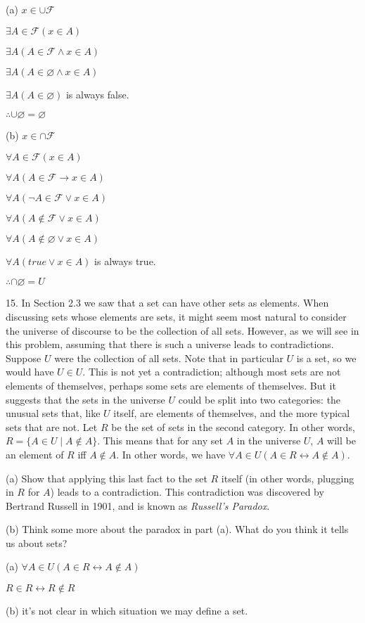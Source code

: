 \documentclass{article}
\begin{document}
(a) $x \in \cup \mathcal{F}$

$\exists A \in \mathcal{F}(x \in A)$

$\exists A (A \in \mathcal{F} \land x \in A)$

$\exists A (A \in \varnothing \land x \in A)$

$\exists A (A \in \varnothing)$ is always false.

$\therefore \cup \varnothing = \varnothing$

\vspace{20pt}

(b) $x \in \cap \mathcal{F}$

$\forall A \in \mathcal{F}(x \in A)$

$\forall A (A \in \mathcal{F} \to x \in A)$

$\forall A (\neg A \in \mathcal{F} \lor x \in A)$

$\forall A (A \notin \mathcal{F} \lor x \in A)$

$\forall A (A \notin \varnothing \lor x \in A)$

$\forall A (true \lor x \in A)$ is always true.

$\therefore \cap \varnothing = U$


\vspace{30pt}

15. In Section 2.3 we saw that a set can have other sets as elements. When
discussing sets whose elements are sets, it might seem most natural to
consider the universe of discourse to be the collection of all sets. However,
as we will see in this problem, assuming that there is such a universe leads
to contradictions.
Suppose $U$ were the collection of all sets. Note that in particular $U$ is
a set, so we would have $U \in U$. This is not yet a contradiction; although
most sets are not elements of themselves, perhaps some sets are elements
of themselves. But it suggests that the sets in the universe $U$ could be
split into two categories: the unusual sets that, like $U$ itself, are elements
of themselves, and the more typical sets that are not. Let $R$ be the set of
sets in the second category. In other words, $R = \{A \in U \mid A \notin A\}$. This
means that for any set $A$ in the universe $U$, $A$ will be an element of $R$ iff
$A \notin A$. In other words, we have $\forall A \in U(A \in R \leftrightarrow A \notin A)$.

\hspace{12pt}(a) Show that applying this last fact to the set $R$ itself (in other words,
plugging in $R$ for $A$) leads to a contradiction. This contradiction was
discovered by Bertrand Russell in 1901, and is known as \textit{Russell's Paradox}.

\hspace{12pt}(b) Think some more about the paradox in part (a). What do you think it
tells us about sets?
\vspace{30pt}

(a) $\forall A \in U(A \in R \leftrightarrow A \notin A)$

$R \in R \leftrightarrow R \notin R$

\vspace{20pt}

(b) it's not clear in which situation we may define a set.
\end{document}
